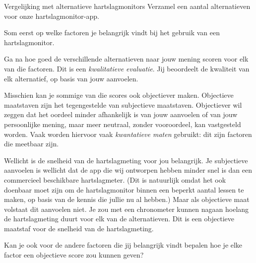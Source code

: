 \begin{opdracht}{Vergelijking met alternatieve hartslagmonitors}
Verzamel een aantal alternatieven voor onze hartslagmonitor-app. 

Som eerst op welke factoren je belangrijk vindt bij het gebruik van een hartslagmonitor. 

Ga na hoe goed de verschillende alternatieven naar jouw mening scoren voor elk van die factoren. Dit is een \emph{kwalitatieve evaluatie}. Jij beoordeelt de kwaliteit van elk alternatief, op basis van jouw aanvoelen.

Misschien kan je sommige van die scores ook objectiever maken. Objectieve maatstaven zijn het tegengestelde van subjectieve maatstaven. Objectiever wil zeggen dat het oordeel minder afhankelijk is van jouw aanvoelen of van jouw persoonlijke mening, maar meer neutraal, zonder vooroordeel, kan vastgesteld worden. Vaak worden hiervoor vaak \emph{kwantatieve maten} gebruikt: dit zijn factoren die meetbaar zijn. 

Wellicht is de snelheid van de hartslagmeting voor jou belangrijk. Je subjectieve aanvoelen is wellicht dat de app die wij ontworpen hebben minder snel is dan een commercieel beschikbare hartslagmeter. (Dit is natuurlijk omdat het ook doenbaar moet zijn om de hartslagmonitor binnen een beperkt aantal lessen te maken, op basis van de kennis die jullie nu al hebben.) Maar als objectieve maat volstaat dit aanvoelen niet. Je zou met een chronometer kunnen nagaan hoelang de hartslagmeting duurt voor elk van de alternatieven. Dit is een objectieve maatstaf voor de snelheid van de hartslagmeting. 

Kan je ook voor de andere factoren die jij belangrijk vindt bepalen hoe je elke factor een objectieve score zou kunnen geven?
\end{opdracht}



